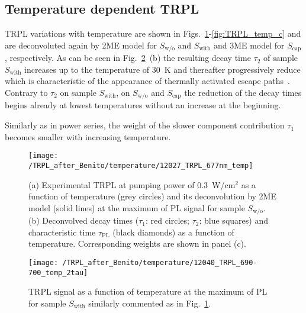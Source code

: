 




\clearpage
\subsection{Temperature dependent TRPL}
\label{chap:TRPL_temp}
%
TRPL variations with temperature are shown in Figs.~\ref{fig:TRPL_temp_wo}-\ref{fig:TRPL_temp_c} and are deconvoluted again by 2ME model for $S_\mathrm{w/o}$ and $S_\mathrm{with}$ and 3ME model for $S_\mathrm{cap}$, respectively. As can be seen in Fig.~\ref{fig:TRPL_temp_w}~(b) the resulting decay time $\tau_2$ of sample $S_\mathrm{with}$ increases up to the temperature of 30~K and thereafter progressively reduce which is characteristic of the appearance of thermally activated escape paths~\citep{Manna_apl2012_TRPLtype2}. Contrary to $\tau_2$ on sample $S_\mathrm{with}$, on $S_\mathrm{w/o}$ and $S_\mathrm{cap}$ the reduction of the decay times begins already at lowest temperatures without an increase at the beginning.

Similarly as in power series, the weight of the slower component contribution $\tau_1$ becomes smaller with increasing temperature.
%
\begin{figure}
	\centering
	\texttt{[image: /TRPL\_after\_Benito/temperature/12027\_TRPL\_677nm\_temp]}
	\caption{(a) Experimental TRPL at pumping power of 0.3~W/cm$^2$ as a function of temperature (grey circles) and its deconvolution by 2ME model (solid lines) at the maximum of PL signal for sample $S_\mathrm{w/o}$. (b) Deconvolved decay times ($\tau_1$: red circles; $\tau_2$: blue squares) and characteristic time $\tau_\mathrm{PL}$ (black diamonds) as a function of temperature. Corresponding weights are shown in panel (c).}
	\label{fig:TRPL_temp_wo}
\end{figure}
%
\begin{figure}
	\centering
	\texttt{[image: /TRPL\_after\_Benito/temperature/12040\_TRPL\_690-700\_temp\_2tau]}
	\caption{TRPL signal as a function of temperature at the maximum of PL for sample $S_\mathrm{with}$ similarly commented as in Fig.~\ref{fig:TRPL_temp_wo}.}
	\label{fig:TRPL_temp_w}
\end{figure}
%


